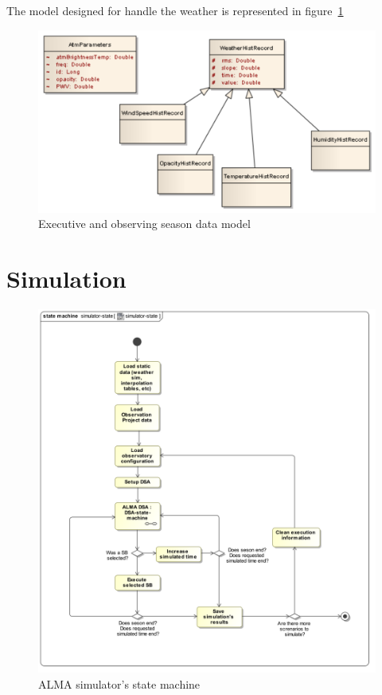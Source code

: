 The model designed for handle the weather is represented in figure~\ref{fig:datamodel-weather}

\begin{figure}[]	
\begin{center}
\includegraphics[width=\textwidth]{images/Weather}
\caption{Executive and observing season data model}
\end{center}
\label{fig:datamodel-weather}
\end{figure}

\section {Simulation}

\begin{figure}[]	
\begin{center}
\includegraphics[width=\textwidth]{images/simulator-state-machine}
\caption{ALMA simulator's state machine}
\end{center}
\label{fig:sim-state-machine}
\end{figure}

